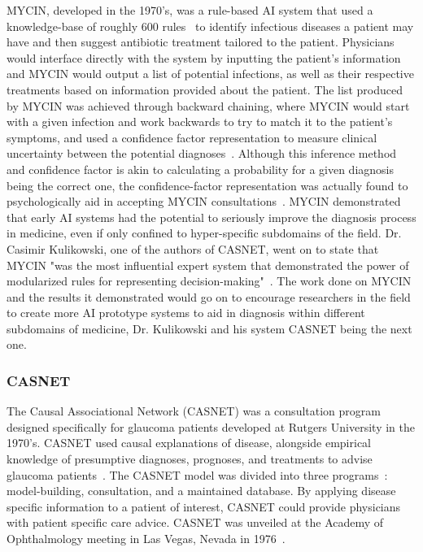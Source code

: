 \documentclass[a4paper]{article}
\begin{document}
MYCIN, developed in the 1970's, was a rule-based AI system that used a knowledge-base of roughly 600 rules~\cite{kaul_history_2020} to identify infectious diseases a patient may have and then suggest antibiotic treatment tailored to the patient. Physicians would interface directly with the system by inputting the patient's information and MYCIN would output a list of potential infections, as well as their respective treatments based on information provided about the patient. The list produced by MYCIN was achieved through backward chaining, where MYCIN would start with a given infection and work backwards to try to match it to the patient's symptoms, and used a confidence factor representation to measure clinical uncertainty between the potential diagnoses~\cite{kulikowski_beginnings_2019}. Although this inference method and confidence factor is akin to calculating a probability for a given diagnosis being the correct one, the confidence-factor representation was actually found to psychologically aid in accepting MYCIN consultations~\cite{kulikowski_beginnings_2019}. MYCIN demonstrated that early AI systems had the potential to seriously improve the diagnosis process in medicine, even if only confined to hyper-specific subdomains of the field. Dr. Casimir Kulikowski, one of the authors of CASNET, went on to state that MYCIN "was the most influential expert system that demonstrated the power of modularized rules for representing decision-making"~\cite{kulikowski_beginnings_2019}. The work done on MYCIN and the results it demonstrated would go on to encourage researchers in the field to create more AI prototype systems to aid in diagnosis within different subdomains of medicine, Dr. Kulikowski and his system CASNET being the next one.

\subsubsection{CASNET}

The Causal Associational Network (CASNET) was a consultation program designed specifically for glaucoma patients developed at Rutgers University in the 1970's. CASNET used causal explanations of disease, alongside empirical knowledge of presumptive diagnoses, prognoses, and treatments to advise glaucoma patients~\cite{kulikowski_beginnings_2019}. The CASNET model was divided into three programs~\cite{kaul_history_2020}: model-building, consultation, and a maintained database. By applying disease specific information to a patient of interest, CASNET could provide physicians with patient specific care advice. CASNET was unveiled at the Academy of Ophthalmology meeting in Las Vegas, Nevada in 1976~\cite{kaul_history_2020}.
\end{document}
